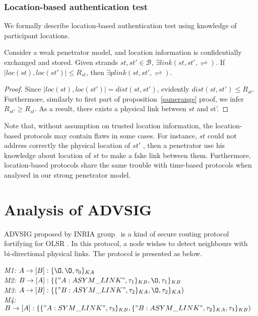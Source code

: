 \subsubsection*{Location-based authentication test}

We formally describe location-based authentication test using knowledge of participant locations. 

\begin{Proposition}
Consider a weak penetrator model, and location information is confidentially exchanged and stored. Given strands $st, st' \in \mathcal{B}$, $\exists link(st,st', \rightleftharpoons)$. If $|loc(st),loc(st')| \le R_{st}$, then $\exists plink(st, st',\rightleftharpoons)$. 
\end{Proposition}

\begin{proof}

Since $|loc(st),loc(st')| = dist(st,st')$, evidently $dist(st,st') \le R_{st}$. Furthermore, similarly to first part of proposition~\ref{samerange} proof, we infer $R_{st'} \ge R_{st}$. As a result, there exists a physical link between $st$ and st'. 

\end{proof}

Note that, without assumption on trusted location information, the location-based protocols may contain flaws in some cases. For instance, $st$ could not address correctly the physical location of $st'$ , then a penetrator use his knowledge about location of $st$ to make a fake link between them. Furthermore, location-based protocols share the same trouble with time-based protocols when analysed in our strong penetrator model. 


\section{Analysis of ADVSIG}

ADVSIG proposed by INRIA group~\cite{Raffo:2004:ASS:1029102.1029106} is a kind of secure routing protocol fortifying for OLSR \cite{Clausen:2003:OLS:RFC3626}. In this protocol, a node wishes to detect neighbours with bi-directional physical links. The protocol is presented as below. 
\begin{flushleft}
 \emph{M1:} $A \to [B]: \{\O, \O, \tau_0\}_{KA}$\\
 \emph{M2:} $B \to [A]: \{\{"A:ASYM\_LINK", \tau_1\}_{KB}, \O,\tau_1\}_{KB}$\\
\emph{M3:} $A \to [B]: \{\{"B:ASYM\_LINK",\tau_2\}_{KA},\O ,\tau_2 \}_{KA})$\\
 \emph{M4:} $B \to [A] : \{\{"A:SYM\_LINK", \tau_3\}_{KB} ,\{"B:ASYM\_LINK",\tau_2\}_{KA} ,\tau_3\}_{KB})$
\end{flushleft}

